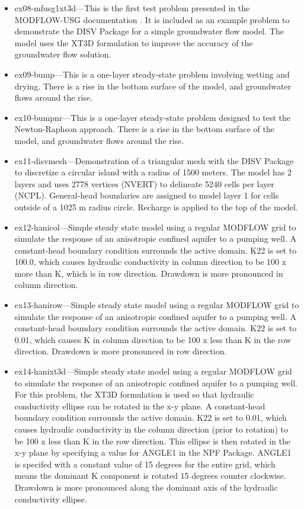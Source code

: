 \begin{itemize}
\item ex08-mfusg1xt3d---This is the first test problem presented in the MODFLOW-USG documentation \citep{modflowusg}.  It is included as an example problem to demonstrate the DISV Package for a simple groundwater flow model.  The model uses the XT3D formulation to improve the accuracy of the groundwater flow solution.

\item ex09-bump---This is a one-layer steady-state problem involving wetting and drying.  There is a rise in the bottom surface of the model, and groundwater flows around the rise.

\item ex10-bumpnr---This is a one-layer steady-state problem designed to test the Newton-Raphson approach.  There is a rise in the bottom surface of the model, and groundwater flows around the rise.

\item ex11-disvmesh---Demonstration of a triangular mesh with the DISV Package to discretize a circular island with a radius of 1500 meters.  The model has 2 layers and uses 2778 vertices (NVERT) to delineate 5240 cells per layer (NCPL).  General-head boundaries are assigned to model layer 1 for cells outside of a 1025 m radius circle.  Recharge is applied to the top of the model.

\item ex12-hanicol---Simple steady state model using a regular MODFLOW grid to simulate the response of an anisotropic confined aquifer to a pumping well. A constant-head boundary condition surrounds the active domain.  K22 is set to 100.0, which causes hydraulic conductivity in column direction to be 100 x more than K, which is in row direction.  Drawdown is more pronounced in column direction.

\item ex13-hanirow---Simple steady state model using a regular MODFLOW grid to simulate the response of an anisotropic confined aquifer to a pumping well. A constant-head boundary condition surrounds the active domain.  K22 is set to 0.01, which causes K in column direction to be 100 x less than K in the row direction.  Drawdown is more pronounced in row direction.

\item ex14-hanixt3d---Simple steady state model using a regular MODFLOW grid to simulate the response of an anisotropic confined aquifer to a pumping well. For this problem, the XT3D formulation is used so that hydraulic conductivity ellipse can be rotated in the x-y plane.  A constant-head boundary condition surrounds the active domain.  K22 is set to 0.01, which causes hydraulic conductivity in the column direction (prior to rotation) to be 100 x less than K in the row direction.  This ellipse is then rotated in the x-y plane by specifying a value for ANGLE1 in the NPF Package.  ANGLE1 is specifed with a constant value of 15 degrees for the entire grid, which means the dominant K component is rotated 15 degrees counter clockwise.  Drawdown is more pronounced along the dominant axis of the hydraulic conductivity ellipse.


\end{itemize}
